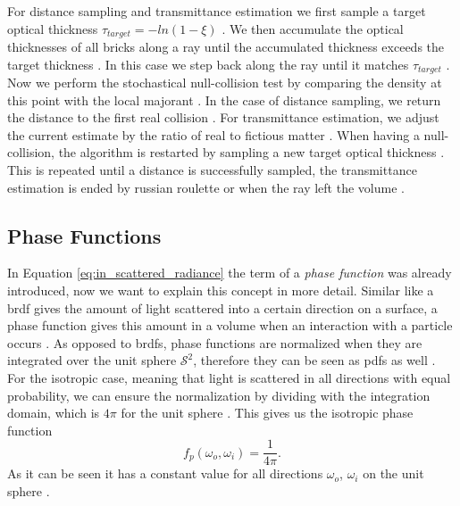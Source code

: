 For distance sampling and transmittance estimation we first sample a target optical thickness $\tau_{target}=-ln(1-\xi)$ \cite{brick_grid}.
We then accumulate the optical thicknesses of all bricks along a ray until the accumulated thickness exceeds the target thickness \cite{brick_grid}.
In this case we step back along the ray until it matches $\tau_{target}$ \cite{brick_grid}.
Now we perform the stochastical null-collision test by comparing the density at this point with the local majorant \cite{brick_grid}.
In the case of distance sampling, we return the distance to the first real collision \cite{brick_grid}.
For transmittance estimation, we adjust the current estimate by the ratio of real to fictious matter \cite{brick_grid}.
When having a null-collision, the algorithm is restarted by sampling a new target optical thickness \cite{brick_grid}.
This is repeated until a distance is successfully sampled, the transmittance estimation is ended by russian roulette or when the ray left the volume \cite{brick_grid}.

\subsection{Phase Functions}
\label{subsec:phase_function}
In Equation \ref{eq:in_scattered_radiance} the term of a \textit{phase function} was already introduced, now we want to explain this concept in more detail.
Similar like a \acs{brdf} gives the amount of light scattered into a certain direction on a surface, a phase function gives this amount in a volume when an interaction with a particle occurs \cite{novak_overview}.
As opposed to \acsp{brdf}, phase functions are normalized when they are integrated over the unit sphere $\mathcal{S}^2$, therefore they can be seen as \acsp{pdf} as well \cite{pbr}.
For the isotropic case, meaning that light is scattered in all directions with equal probability, we can ensure the normalization by dividing with the integration domain, which is $4\pi$ for the unit sphere \cite{pbr}.
This gives us the isotropic phase function
\begin{equation*}
    f_p(\omega_o, \omega_i)=\frac{1}{4\pi}.
\end{equation*}
As it can be seen it has a constant value for all directions $\omega_o$, $\omega_i$ on the unit sphere \cite{novak_overview}.


